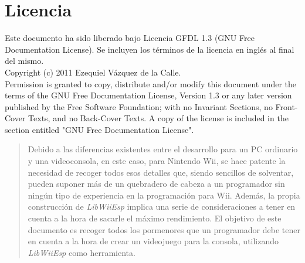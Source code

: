 
\section*{Licencia}

Este documento ha sido liberado bajo Licencia GFDL 1.3 (GNU Free
Documentation License). Se incluyen los términos de la licencia en
inglés al final del mismo.\\

Copyright (c) 2011 Ezequiel Vázquez de la Calle.\\

Permission is granted to copy, distribute and/or modify this document under the
terms of the GNU Free Documentation License, Version 1.3 or any later version
published by the Free Software Foundation; with no Invariant Sections, no
Front-Cover Texts, and no Back-Cover Texts. A copy of the license is included in
the section entitled "GNU Free Documentation License".\\

\clearpage

\tableofcontents
\clearpage
\listoffigures
\listoftables
\clearpage

\begin{abstract}
Debido a las diferencias existentes entre el desarrollo para un PC ordinario y una videoconsola, en este caso, para Nintendo Wii, se hace patente la necesidad de recoger todos esos detalles que, siendo sencillos de solventar, pueden suponer más de un quebradero de cabeza a un programador sin ningún tipo de experiencia en la programación para Wii. Además, la propia construcción de \emph{LibWiiEsp} implica una serie de consideraciones a tener en cuenta a la hora de sacarle el máximo rendimiento. El objetivo de este documento es recoger todos los pormenores que un programador debe tener en cuenta a la hora de crear un videojuego para la consola, utilizando \emph{LibWiiEsp} como herramienta.
\end{abstract}


